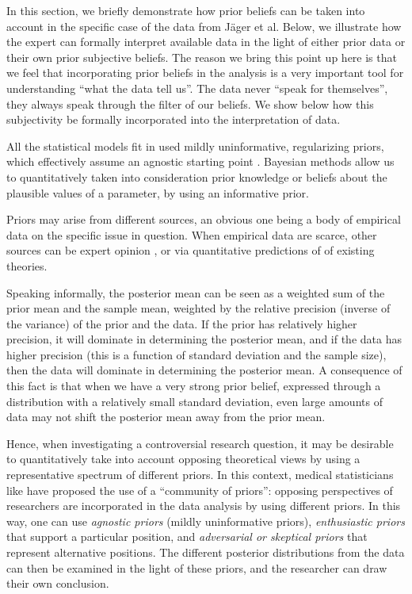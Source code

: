 \documentclass{cambridge7A}\usepackage[]{graphicx}\usepackage[]{color}
\begin{document}
In this section, we briefly demonstrate how prior beliefs can be taken into account in the specific case of the data from J\"ager et al. Below, we illustrate how the expert can formally interpret available data in the light of either prior data or their own prior subjective beliefs. The reason we bring this point up here is that we feel that incorporating prior beliefs in the analysis is a very important tool for understanding ``what the data tell us''. The data never ``speak for themselves'', they always speak through the filter of our beliefs. We show below how this subjectivity be formally incorporated into the interpretation of data.

All the statistical models fit in \cite{JaegerMertzenVanDykeVasishth2019} used  mildly uninformative,  regularizing priors, which effectively assume an agnostic starting point \citep{SchadEtAlWorkflow}.    Bayesian methods allow us to quantitatively taken into consideration  prior knowledge or beliefs about the plausible values of a parameter, by using an informative prior. 

Priors may arise from different sources, an obvious one being a body of empirical data on the specific issue in question.  When empirical data are scarce, other sources can be  expert opinion \citep{ohagan2006uncertain,OakleyOHagan}, or via quantitative predictions of of existing theories.  

Speaking informally, the posterior mean can be seen as a weighted sum of the prior mean and the sample mean, weighted by the relative precision (inverse of the variance) of the prior and the data. If the prior has relatively higher precision, it will dominate in determining the posterior mean, and if the data has higher precision (this is a function of standard deviation and the sample size), then the data will dominate in determining the posterior mean. A consequence of this fact is that when we have a very strong prior belief, expressed through a distribution with a relatively small standard deviation, even large amounts of data may not shift the posterior mean away from the prior mean. 

Hence, when investigating a controversial research question, it may be desirable to quantitatively take into account opposing theoretical views by using a representative spectrum of different priors. In this context, medical statisticians like \cite{spiegelhalter2004bayesian} have proposed the use of a  ``community of priors'': opposing perspectives of researchers are  incorporated in the data analysis by using different priors.  In this way, one can use  \textit{agnostic priors} (mildly uninformative priors), \textit{enthusiastic priors} that support a particular position, and   \textit{adversarial or skeptical priors} that represent alternative positions. The different posterior distributions from the data can then be examined in the light of these priors, and the researcher can draw their own conclusion. 
\end{document}
